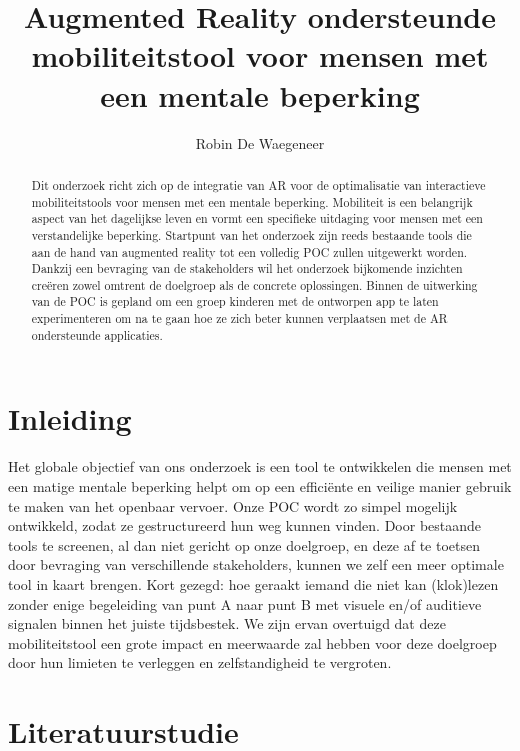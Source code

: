 \documentclass{hogent-article}
\title{Augmented Reality ondersteunde mobiliteitstool voor mensen met een mentale beperking}
\author{Robin De Waegeneer}
\begin{document}
  \begin{abstract}
    Dit onderzoek richt zich op de integratie van AR voor de optimalisatie van interactieve mobiliteitstools voor mensen met een mentale beperking. Mobiliteit is een belangrijk aspect van het dagelijkse leven en vormt een specifieke uitdaging voor mensen met een verstandelijke beperking. Startpunt van het onderzoek zijn reeds bestaande tools die aan de hand van augmented reality tot een volledig POC zullen uitgewerkt worden. Dankzij een bevraging van de stakeholders wil het onderzoek bijkomende inzichten creëren zowel omtrent de doelgroep als de concrete oplossingen. Binnen de uitwerking van de POC is gepland om een groep kinderen met de ontworpen app te laten experimenteren om na te gaan hoe ze zich beter kunnen verplaatsen met de AR ondersteunde applicaties.
  \end{abstract}

\tableofcontents

\bigskip

\section{Inleiding}%
    \label{sec:inleiding}
    
    Het globale objectief van ons onderzoek is een tool te ontwikkelen die mensen met een matige mentale beperking helpt om op een efficiënte en veilige manier gebruik te maken van het openbaar vervoer. Onze POC wordt zo simpel mogelijk ontwikkeld, zodat ze gestructureerd hun weg kunnen vinden. Door bestaande tools te screenen, al dan niet gericht op onze doelgroep, en deze af te toetsen door bevraging van verschillende stakeholders, kunnen we zelf een meer optimale tool in kaart brengen. Kort gezegd: hoe geraakt iemand die niet kan (klok)lezen zonder enige begeleiding van punt A naar punt B met visuele en/of auditieve signalen binnen het juiste tijdsbestek.
    We zijn ervan overtuigd dat deze mobiliteitstool een grote impact en meerwaarde zal hebben voor deze doelgroep door hun limieten te verleggen en zelfstandigheid te vergroten.
    
    \section{Literatuurstudie}%
    \label{sec:literatuurstudie}
    
\end{document}
